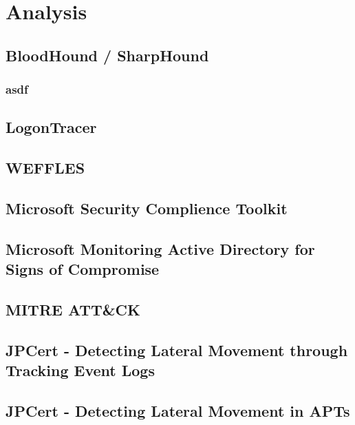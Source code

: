 \section{Analysis}

\subsection{BloodHound / SharpHound}
\subsubsection{asdf}

\subsection{LogonTracer}

\subsection{WEFFLES}

\subsection{Microsoft Security Complience Toolkit}

\subsection{Microsoft Monitoring Active Directory for Signs of Compromise}

\subsection{MITRE ATT\&CK}

\subsection{JPCert - Detecting Lateral Movement through Tracking Event Logs}

\subsection{JPCert - Detecting Lateral Movement in APTs}
